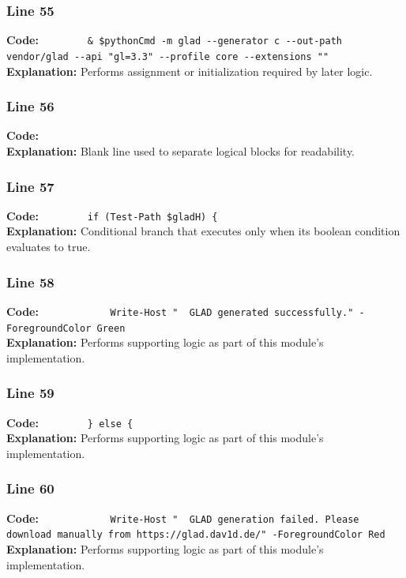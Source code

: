 \documentclass[11pt,a4paper]{article}
\begin{document}
\subsubsection*{Line 55}
\textbf{Code:} \verb|        & $pythonCmd -m glad --generator c --out-path vendor/glad --api "gl=3.3" --profile core --extensions ""|\\
\textbf{Explanation:} Performs assignment or initialization required by later logic.

\subsubsection*{Line 56}
\textbf{Code:} \verb|        |\\
\textbf{Explanation:} Blank line used to separate logical blocks for readability.

\subsubsection*{Line 57}
\textbf{Code:} \verb|        if (Test-Path $gladH) {|\\
\textbf{Explanation:} Conditional branch that executes only when its boolean condition evaluates to true.

\subsubsection*{Line 58}
\textbf{Code:} \verb|            Write-Host "  GLAD generated successfully." -ForegroundColor Green|\\
\textbf{Explanation:} Performs supporting logic as part of this module's implementation.

\subsubsection*{Line 59}
\textbf{Code:} \verb|        } else {|\\
\textbf{Explanation:} Performs supporting logic as part of this module's implementation.

\subsubsection*{Line 60}
\textbf{Code:} \verb|            Write-Host "  GLAD generation failed. Please download manually from https://glad.dav1d.de/" -ForegroundColor Red|\\
\textbf{Explanation:} Performs supporting logic as part of this module's implementation.
\end{document}
